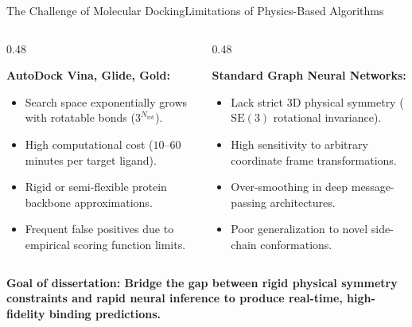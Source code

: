 \documentclass[10pt,aspectratio=169]{beamer}
\begin{document}
\begin{frame}{The Challenge of Molecular Docking}{Limitations of Physics-Based Algorithms}
  \begin{columns}[T]
    \begin{column}{0.48\textwidth}
      \begin{tcolorbox}[defensebox,title={\faFlask \quad Classical Physics-Based Methods}]
        \small
        \textbf{AutoDock Vina, Glide, Gold:}
        \vspace{3pt}
        \begin{itemize}
          \setlength{\itemsep}{3pt}
          \item Search space exponentially grows with rotatable bonds ($3^{N_{\text{rot}}}$).
          \item High computational cost ($10$--$60$ minutes per target ligand).
          \item Rigid or semi-flexible protein backbone approximations.
          \item Frequent false positives due to empirical scoring function limits.
        \end{itemize}
      \end{tcolorbox}
    \end{column}
    
    \begin{column}{0.48\textwidth}
      \begin{tcolorbox}[alertbox,title={\faExclamationTriangle \quad Deep Learning Gaps}]
        \small
        \textbf{Standard Graph Neural Networks:}
        \vspace{3pt}
        \begin{itemize}
          \setlength{\itemsep}{3pt}
          \item Lack strict 3D physical symmetry ($\mathrm{SE}(3)$ rotational invariance).
          \item High sensitivity to arbitrary coordinate frame transformations.
          \item Over-smoothing in deep message-passing architectures.
          \item Poor generalization to novel side-chain conformations.
        \end{itemize}
      \end{tcolorbox}
    \end{column}
  \end{columns}

  \vspace{4pt}
  \begin{tcolorbox}[colback=TealPrimary!10,colframe=TealPrimary,arc=2pt,boxrule=0.5pt,top=3pt,bottom=3pt]
    \tiny\color{NavyDark}\bfseries
    \faCheckCircle \quad Goal of dissertation: Bridge the gap between rigid physical symmetry constraints and rapid neural inference to produce real-time, high-fidelity binding predictions.
  \end{tcolorbox}
\end{frame}
\end{document}
